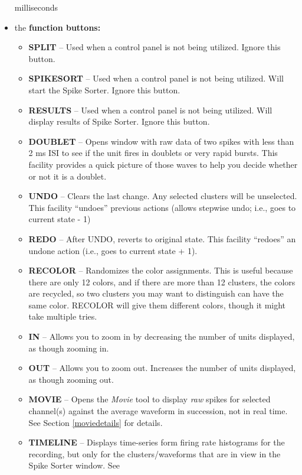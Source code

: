 \documentclass[12pt]{article}
\begin{document}
\begin{itemize}
  milliseconds
\item the \textbf{function buttons:}
\begin{itemize}
\item \textbf{\textsf{SPLIT}} -- Used when a control panel is not being
  utilized. Ignore this button.
\item \textbf{\textsf{SPIKESORT}} -- Used when a control panel is not being
  utilized. Will start the Spike Sorter. Ignore this button.
\item \textbf{\textsf{RESULTS}} -- Used when a control panel is not being
  utilized. Will display results of Spike Sorter. Ignore this button.
\item \textbf{\textsf{DOUBLET}} -- Opens window with raw data of two spikes
  with less than 2 ms ISI to see if the unit fires in doublets or very
  rapid bursts. This facility provides a quick picture of those waves
  to help you decide whether or not it is a doublet.
\item \textbf{\textsf{UNDO}} -- Clears the last change. Any selected clusters
  will be unselected. This facility ``undoes'' previous actions
  (allows stepwise undo; i.e., goes to current state - 1)
\item \textbf{\textsf{REDO}} -- After {\sf UNDO}, reverts to original
  state. This facility ``redoes'' an undone action (i.e., goes to
  current state + 1).
\item \textbf{\textsf{RECOLOR}} -- Randomizes the color assignments.
  This is useful because there are only 12 colors, and if there are
  more than 12 clusters, the colors are recycled, so two clusters you
  may want to distinguish can have the same color.  {\sf RECOLOR} will
  give them different colors, though it might take multiple tries.
\item \textbf{\textsf{IN}} -- Allows you to zoom in by decreasing the number of
  units displayed, as though zooming in.
\item \textbf{\textsf{OUT}} -- Allows you to zoom out. Increases the number of
  units displayed, as though zooming out.
\item \textbf{\textsf{MOVIE}} -- Opens the \textit{Movie} tool to
  display \textit{raw} spikes for selected channel(s) against the
  average waveform in succession, not in real time. See Section
  \ref{moviedetails} for details.
\item \textbf{\textsf{TIMELINE}} -- Displays time-series form firing
  rate histograms for the recording, but only for the
  clusters/waveforms that are in view in the Spike Sorter window. See

\end{itemize}
\end{itemize}
\end{document}
